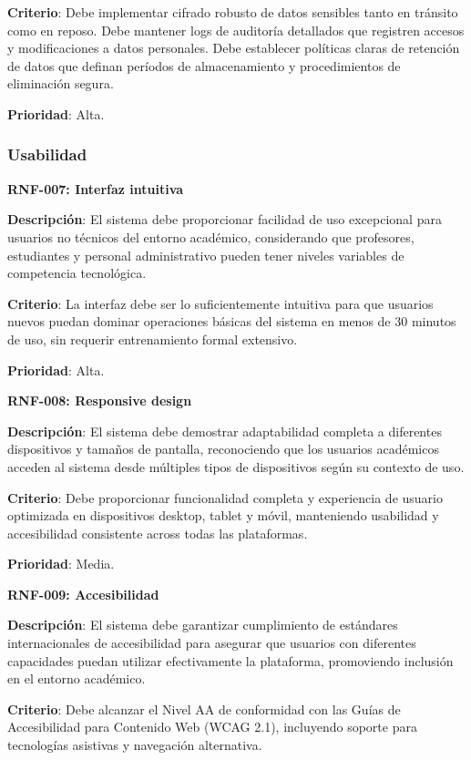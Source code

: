 \documentclass[12pt,a4paper,oneside]{report}
\begin{document}
\textbf{Criterio}: Debe implementar cifrado robusto de datos sensibles tanto en tránsito como en reposo. Debe mantener logs de auditoría detallados que registren accesos y modificaciones a datos personales. Debe establecer políticas claras de retención de datos que definan períodos de almacenamiento y procedimientos de eliminación segura.

\textbf{Prioridad}: Alta.

\subsubsection{Usabilidad}\label{usabilidad}

\textbf{RNF-007: Interfaz intuitiva}

\textbf{Descripción}: El sistema debe proporcionar facilidad de uso excepcional para usuarios no técnicos del entorno académico, considerando que profesores, estudiantes y personal administrativo pueden tener niveles variables de competencia tecnológica.

\textbf{Criterio}: La interfaz debe ser lo suficientemente intuitiva para que usuarios nuevos puedan dominar operaciones básicas del sistema en menos de 30 minutos de uso, sin requerir entrenamiento formal extensivo.

\textbf{Prioridad}: Alta.

\textbf{RNF-008: Responsive design}

\textbf{Descripción}: El sistema debe demostrar adaptabilidad completa a diferentes dispositivos y tamaños de pantalla, reconociendo que los usuarios académicos acceden al sistema desde múltiples tipos de dispositivos según su contexto de uso.

\textbf{Criterio}: Debe proporcionar funcionalidad completa y experiencia de usuario optimizada en dispositivos desktop, tablet y móvil, manteniendo usabilidad y accesibilidad consistente across todas las plataformas.

\textbf{Prioridad}: Media.

\textbf{RNF-009: Accesibilidad}

\textbf{Descripción}: El sistema debe garantizar cumplimiento de estándares internacionales de accesibilidad para asegurar que usuarios con diferentes capacidades puedan utilizar efectivamente la plataforma, promoviendo inclusión en el entorno académico.

\textbf{Criterio}: Debe alcanzar el Nivel AA de conformidad con las Guías de Accesibilidad para Contenido Web (WCAG 2.1), incluyendo soporte para tecnologías asistivas y navegación alternativa.
\end{document}
